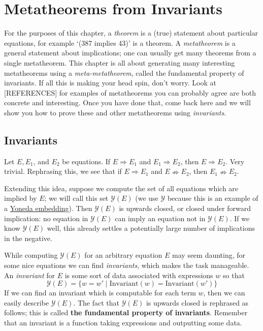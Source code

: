 \chapter{Metatheorems from Invariants}
For the purposes of this chapter, a \emph{theorem} is a (true) statement about particular equations, for example `(387 implies 43)' is a theorem. A \emph{metatheorem} is a general statement about implications; one can usually get many theorems from a single metatheorem. This chapter is all about generating many interesting metatheorems using a \emph{meta-metatheorem}, called the fundamental property of invariants. If all this is making your head spin, don't worry. Look at [REFERENCES] for examples of metatheorems you can probably agree are both concrete and interesting. Once you have done that, come back here and we will show you how to prove these and other metatheorems using \emph{invariants}.

\section{Invariants}
Let $E, E_1$, and $E_2$ be equations. If $E \Rightarrow E_1$ and $E_1 \Rightarrow E_2$, then $E \Rightarrow E_2$. Very trivial. Rephrasing this, we see that if $E \Rightarrow E_1$ and $E \nRightarrow E_2$, then $E_1\nRightarrow E_2$.

Extending this idea, suppose we compute the set of all equations which are implied by $E$; we will call this set $\mathcal{Y}(E)$ (we use $\mathcal{Y}$ because this is an example of a \href{https://en.wikipedia.org/wiki/Yoneda_lemma#The_Yoneda_embedding}{Yoneda embedding}). Then $\mathcal{Y}(E)$ is upwards closed, or closed under forward implication: no equation in $\mathcal{Y}(E)$ can imply an equation not in $\mathcal{Y}(E)$. If we know $\mathcal{Y}(E)$ well, this already settles a potentially large number of implications in the negative.

While computing $\mathcal{Y}(E)$ for an arbitrary equation $E$ may seem daunting, for some nice equations we can find \emph{invariants}, which makes the task manageable. An \emph{invariant} for $E$ is some sort of data associated with expressions $w$ so that
\[
\mathcal{Y}(E) = \{w = w' \mid \text{Invariant}(w) = \text{Invariant}(w')\}
\]
If we can find an invariant which is computable for each term $w$, then we can easily describe $\mathcal{Y}(E)$. The fact that $\mathcal{Y}(E)$ is upwards closed is rephrased as follows; this is called \textbf{the fundamental property of invariants}. Remember that an invariant is a function taking expressions and outputting some data.

